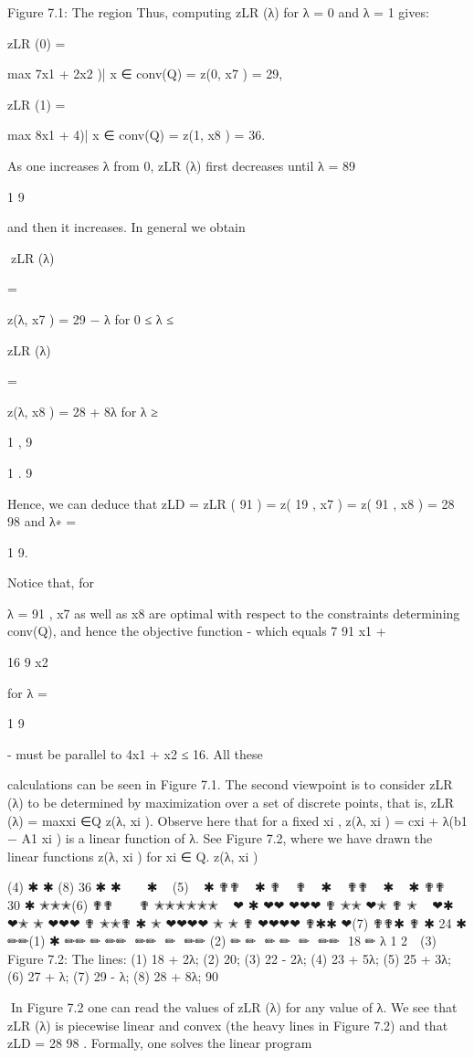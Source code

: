 Figure 7.1: The region
Thus, computing zLR (λ) for λ = 0 and λ = 1 gives:

zLR (0) =

max {7x1 + 2x2 )| x ∈ conv(Q)} = z(0, x7 ) = 29,

zLR (1) =

max {8x1 + 4)| x ∈ conv(Q)} = z(1, x8 ) = 36.

As one increases λ from 0, zLR (λ) first decreases until λ =
89

1
9

and then it increases. In general we obtain

zLR (λ)

=

z(λ, x7 ) = 29 − λ for 0 ≤ λ ≤

zLR (λ)

=

z(λ, x8 ) = 28 + 8λ for λ ≥

1
,
9

1
.
9

Hence, we can deduce that zLD = zLR ( 91 ) = z( 19 , x7 ) = z( 91 , x8 ) = 28 98 and λ∗ =

1
9.

Notice that, for

λ = 91 , x7 as well as x8 are optimal with respect to the constraints determining conv(Q), and hence the
objective function - which equals 7 91 x1 +

16
9 x2

for λ =

1
9

- must be parallel to 4x1 + x2 ≤ 16. All these

calculations can be seen in Figure 7.1.
The second viewpoint is to consider zLR (λ) to be determined by maximization over a set of discrete
points, that is,
zLR (λ) = maxxi ∈Q z(λ, xi ).
Observe here that for a fixed xi , z(λ, xi ) = cxi + λ(b1 − A1 xi ) is a linear function of λ. See Figure 7.2,
where we have drawn the linear functions z(λ, xi ) for xi ∈ Q.
z(λ, xi )

(4)
✱
✱
(8)
36
✱
✱
 
 
✱
 
(5)
 
✱
✟✟
 
✱
✟
 
✟
 
✱
 
✟✟
 
✱
 
✱ ✟✟
 
 
30
✱
✭✭✭(6)
✟✟
 
 
✟ ✭✭✭✭✭✭
 
❤
✱
❤❤
❤❤❤
✟
✭✭
❤✭
✟
✭
 
❤✱
❤✭
✭
❤❤❤
✟
✭✭✟
✱
✭
❤❤❤❤
✭
✭
✟
❤❤❤❤
✟✱✱
❤(7)
✟✟✱
✟
✱
24 ✱
✏✏(1)
✱
✏✏
✏
✏✏

✏✏

✏

✏✏
(2)
✏
✏

✏
✏

✏

✏✏

18 ✏
λ
1
2 
 (3)

Figure 7.2: The lines: (1) 18 + 2λ; (2) 20; (3) 22 - 2λ; (4) 23 + 5λ; (5) 25 + 3λ; (6) 27 + λ; (7) 29 - λ;
(8) 28 + 8λ;
90

In Figure 7.2 one can read the values of zLR (λ) for any value of λ. We see that zLR (λ) is piecewise linear
and convex (the heavy lines in Figure 7.2) and that zLD = 28 98 . Formally, one solves the linear program

